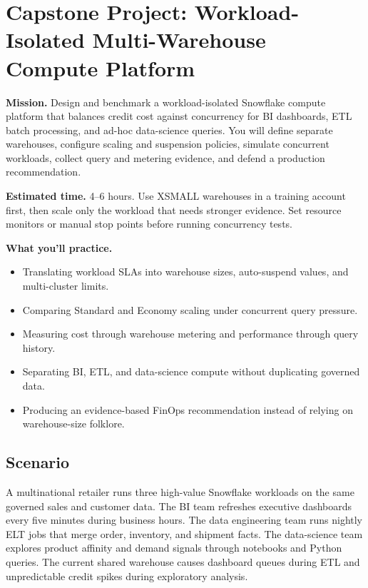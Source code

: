 \section{Capstone Project: Workload-Isolated Multi-Warehouse Compute Platform}\label{sec:ch2-capstone}

\begin{capstonebox}
\textbf{Mission.} Design and benchmark a workload-isolated Snowflake compute platform that balances credit cost against concurrency for BI dashboards, ETL batch processing, and ad-hoc data-science queries. You will define separate warehouses, configure scaling and suspension policies, simulate concurrent workloads, collect query and metering evidence, and defend a production recommendation.

\textbf{Estimated time.} 4--6 hours. Use XSMALL warehouses in a training account first, then scale only the workload that needs stronger evidence. Set resource monitors or manual stop points before running concurrency tests.

\textbf{What you'll practice.}
\begin{itemize}
    \item Translating workload SLAs into warehouse sizes, auto-suspend values, and multi-cluster limits.
    \item Comparing Standard and Economy scaling under concurrent query pressure.
    \item Measuring cost through warehouse metering and performance through query history.
    \item Separating BI, ETL, and data-science compute without duplicating governed data.
    \item Producing an evidence-based FinOps recommendation instead of relying on warehouse-size folklore.
\end{itemize}
\end{capstonebox}

\subsection*{Scenario}
A multinational retailer runs three high-value Snowflake workloads on the same governed sales and customer data. The BI team refreshes executive dashboards every five minutes during business hours. The data engineering team runs nightly ELT jobs that merge order, inventory, and shipment facts. The data-science team explores product affinity and demand signals through notebooks and Python queries. The current shared warehouse causes dashboard queues during ETL and unpredictable credit spikes during exploratory analysis.

